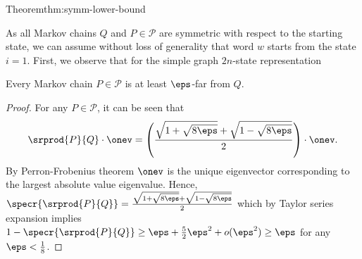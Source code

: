 \begin{prevproof}{Theorem}{thm:symm-lower-bound}

As all Markov chains $Q$ and $P\in\mathcal{P}$ are symmetric with respect to the starting state, we can assume without loss of generality that word $w$ starts from
the state $i=1$. First, we observe that for the simple graph $2n$-state representation  
\begin{lemma}
	\label{clm:p-far-from-q}
	Every Markov chain $P \in \mathcal{P}$ is at least $\eps$-far from $Q$.
\end{lemma}
\begin{proof}
	For any $P \in \mathcal{P}$, it can be seen that 
	$$\srprod{P}{Q}\circ \onev = \left(\frac{\sqrt{1+\sqrt{8\eps}}+\sqrt{1-\sqrt{8\eps}}}{2}\right)\cdot\onev.$$
	By Perron-Frobenius theorem $\onev$ is the unique eigenvector corresponding to the largest absolute value eigenvalue.  
	Hence, $\specr{\srprod{P}{Q}} = \frac{\sqrt{1+\sqrt{8\eps}}+\sqrt{1-\sqrt{8\eps}}}{2}$ which by Taylor series expansion implies $1-\specr{\srprod{P}{Q}}\ge\eps+\frac{5}{2}\eps^2+o(\eps^2)
	\ge \eps$ for any $\eps<\frac{1}{8}$.
\end{proof}


\end{prevproof}
